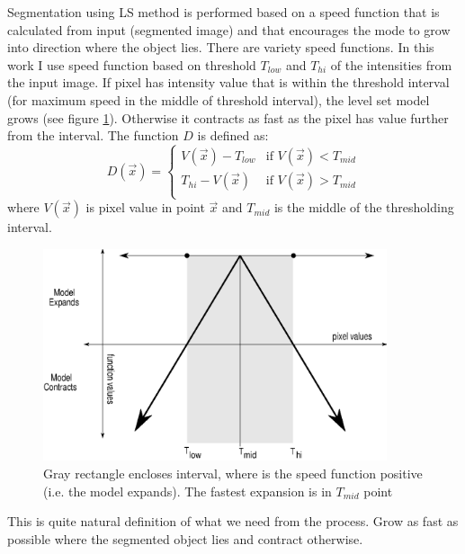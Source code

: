 Segmentation using LS method is performed based on a speed function that is calculated from input (segmented image) and that encourages the mode to grow into direction where the object lies.
There are variety speed functions. In this work I use speed function based on threshold $T_{low}$ and $T_{hi}$ of the intensities from the input image.
If pixel has intensity value that is within the threshold interval (for maximum speed in the middle of threshold interval), the level set model grows (see figure \ref{fg:speedFunction}).
Otherwise it contracts as fast as the pixel has value further from the interval. The function $D$ is defined as:
\begin{equation}
\label{eq:speedFunction}
D(\vec{x}) =
\begin{cases}
V(\vec{x}) - T_{low} & \text{if $V(\vec{x}) < T_{mid}$}\\
T_{hi} - V(\vec{x}) & \text{if $V(\vec{x}) > T_{mid}$}\\
\end{cases}
\end{equation}
where $V(\vec{x})$ is pixel value in point $\vec{x}$ and $T_{mid}$ is the middle of the thresholding interval.

\begin{figure}
    \centering
    \includegraphics[width=0.9\textwidth]{data/speedFunction}
    \caption[Graph of thresholding based speed function]
    {
      Gray rectangle encloses interval, where is the speed function positive (i.e. the model expands).
      The fastest expansion is in $T_{mid}$ point
    }
    \label{fg:speedFunction}
\end{figure}

This is quite natural definition of what we need from the process.
Grow as fast as possible where the segmented object lies and contract otherwise.

